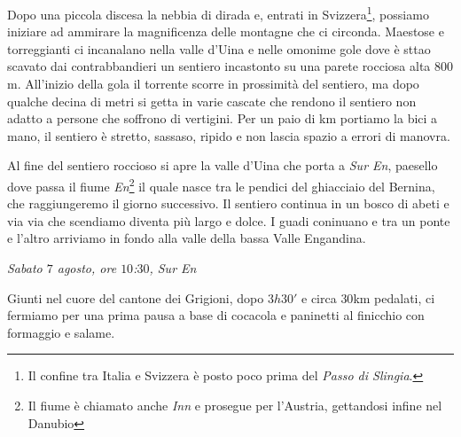 Dopo una piccola discesa la nebbia di dirada e, entrati in Svizzera\footnote{Il confine tra Italia e Svizzera è posto poco prima del \emph{Passo di Slingia}.}, possiamo iniziare ad ammirare la magnificenza delle montagne che ci circonda.
Maestose e torreggianti ci incanalano nella valle d'Uina e nelle omonime gole dove è sttao scavato dai contrabbandieri un sentiero incastonto su una parete rocciosa alta $800$m.
All'inizio della gola il torrente scorre in prossimità del sentiero, ma dopo qualche decina di metri si getta in varie cascate che rendono il sentiero non adatto a persone che soffrono di vertigini.
Per un paio di km portiamo la bici a mano, il sentiero è stretto, sassaso, ripido e non lascia spazio a errori di manovra.

Al fine del sentiero roccioso si apre la valle d'Uina che porta a \emph{Sur En}, paesello dove passa il fiume \emph{En}\footnote{Il fiume è chiamato anche \emph{Inn} e prosegue per l'Austria, gettandosi infine nel Danubio} il quale nasce tra le pendici del ghiacciaio del Bernina, che raggiungeremo il giorno successivo.
Il sentiero continua in un bosco di abeti e via via che scendiamo diventa più largo e dolce.
I guadi coninuano e tra un ponte e l'altro arriviamo in fondo alla valle della bassa Valle Engandina.

\emph{Sabato $7$ agosto, ore $10$:$30$, Sur En} 
\vspace{2mm}

Giunti nel cuore del cantone dei Grigioni, dopo $3h30'$ e circa $30$km pedalati, ci fermiamo per una prima pausa a base di cocacola e paninetti al finicchio con formaggio e salame.


